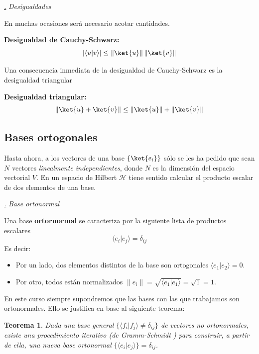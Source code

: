 \documentclass[a4paper,11pt]{book} %
\newtheorem{teorema_contador}{Teorema}
\newcommand{\Teorema}[1]{
		\begin{mybox_gray2}{}
			\begin{teorema_contador}
				 #1 
			\end{teorema_contador} 
		\end{mybox_gray2}
	}
\numberwithin{equation}{chapter}
\newcommand{\braket}[2]{\langle #1|#2\rangle}
\def\subsubiContadorIt{\par\addtocounter{subsubsection}{1}\underline{\it\thesubsubsection.}\hskip0.5cm \setcounter{subsubsubsectionIt}{0}}
\newcommand{\SubsubiIt}[1]{
		\subsubiContadorIt \textit{#1}
	}
\newcounter{subsubsubsectionIt}[subsubsection]
\begin{document}
			\SubsubiIt{Desigualdades}

En muchas ocasiones será necesario acotar cantidades. 
	\begin{mybox_gray2}{}
	\textbf{Desigualdad de Cauchy-Schwarz:}
		\begin{equation}
		|\braket{u}{v}| \leq \|\ket{u}\|\, \|\ket{v}\|
		\end{equation}
	\end{mybox_gray2}

Una consecuencia inmediata  de la desigualdad de Cauchy-Schwarz es la desigualdad triangular
	\begin{mybox_gray2}{}
	\textbf{Desigualdad triangular:}
		\begin{equation}
		\|\ket{u}+\ket{v}\| \leq \|\ket{u}\|+ \|\ket{v}\|
		\end{equation}
	\end{mybox_gray2}


		\subsection{Bases ortogonales}

Hasta ahora, a los vectores de una base $\{\ket{e_i}\}$ sólo se les ha pedido que sean $N$ vectores \textit{linealmente independientes}, donde $N$ es la dimensión del espacio vectorial $V$. En un espacio de Hilbert $\mathcal{H}$ tiene sentido calcular el producto escalar de dos elementos de una base. 


			\SubsubiIt{Base ortonormal}

	\begin{mybox_gray2}{}
Una base \textbf{ortornormal} se caracteriza por la siguiente lista de productos escalares
	\begin{equation}
	\braket{e_i}{e_j} = \delta_{ij}
	\end{equation}
Es decir:
\begin{itemize}
	\item Por un lado, dos elementos distintos de la base son ortogonales $\braket{e_1}{e_2} = 0$.
	\item Por otro, todos están normalizados  $ \| e_i \| = \sqrt{\braket{e_1}{e_1}} = \sqrt{1} = 1$.
\end{itemize}
	\end{mybox_gray2}

En este curso siempre supondremos que las bases con las que trabajamos son ortonormales. Ello se justifica en base al siguiente teorema:
	\Teorema{ \label{teorema_formalismo_gramm_schmidt}
	Dada una base general $\{\braket{f_i}{f_j}\neq \delta_{ij}\}$ de vectores no ortonormales, existe una procedimiento iterativo (de Gramm-Schmidt \cite{bib_wiki_GramSchmidt}) para construir, a partir de ella, una nueva base ortonormal $\{\braket{e_i}{e_j}\}=\delta_{ij}$.
	}
\end{document}
